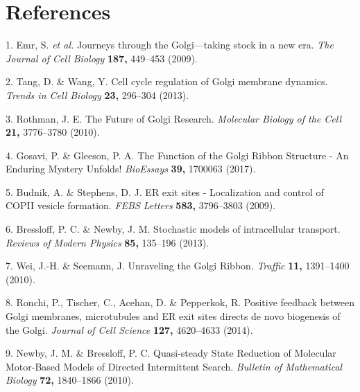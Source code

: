 \documentclass{Dissertate}
\begin{document}
\footnotesize

\hypertarget{references}{%
\chapter*{References}\label{references}}

\hypertarget{refs}{}
\leavevmode\hypertarget{ref-emr_journeys_2009}{}%
1. Emr, S. \emph{et al.} Journeys through the Golgi---taking stock in a
new era. \emph{The Journal of Cell Biology} \textbf{187,} 449--453
(2009).

\leavevmode\hypertarget{ref-tang_cell_2013}{}%
2. Tang, D. \& Wang, Y. Cell cycle regulation of Golgi membrane
dynamics. \emph{Trends in Cell Biology} \textbf{23,} 296--304 (2013).

\leavevmode\hypertarget{ref-rothman_future_2010}{}%
3. Rothman, J. E. The Future of Golgi Research. \emph{Molecular Biology
of the Cell} \textbf{21,} 3776--3780 (2010).

\leavevmode\hypertarget{ref-gosavi_function_2017}{}%
4. Gosavi, P. \& Gleeson, P. A. The Function of the Golgi Ribbon
Structure - An Enduring Mystery Unfolds! \emph{BioEssays} \textbf{39,}
1700063 (2017).

\leavevmode\hypertarget{ref-budnik_er_2009}{}%
5. Budnik, A. \& Stephens, D. J. ER exit sites - Localization and
control of COPII vesicle formation. \emph{FEBS Letters} \textbf{583,}
3796--3803 (2009).

\leavevmode\hypertarget{ref-bressloff_stochastic_2013}{}%
6. Bressloff, P. C. \& Newby, J. M. Stochastic models of intracellular
transport. \emph{Reviews of Modern Physics} \textbf{85,} 135--196
(2013).

\leavevmode\hypertarget{ref-wei_unraveling_2010}{}%
7. Wei, J.-H. \& Seemann, J. Unraveling the Golgi Ribbon. \emph{Traffic}
\textbf{11,} 1391--1400 (2010).

\leavevmode\hypertarget{ref-ronchi_positive_2014}{}%
8. Ronchi, P., Tischer, C., Acehan, D. \& Pepperkok, R. Positive
feedback between Golgi membranes, microtubules and ER exit sites directs
de novo biogenesis of the Golgi. \emph{Journal of Cell Science}
\textbf{127,} 4620--4633 (2014).

\leavevmode\hypertarget{ref-newby_quasi-steady_2010}{}%
9. Newby, J. M. \& Bressloff, P. C. Quasi-steady State Reduction of
Molecular Motor-Based Models of Directed Intermittent Search.
\emph{Bulletin of Mathematical Biology} \textbf{72,} 1840--1866 (2010).
\end{document}
